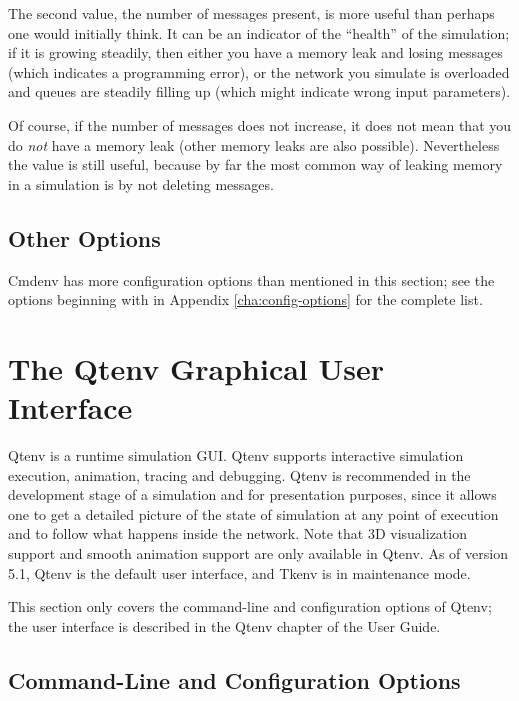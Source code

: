 The second value, the number of messages present, is more useful than
perhaps one would initially think. It can be an indicator of the ``health'' of the simulation;
if it is growing steadily, then either you have a memory leak and losing
messages (which indicates a programming error), or the network you simulate is
overloaded and queues are steadily filling up (which might indicate wrong input
parameters).

Of course, if the number of messages does not increase, it does not mean
that you do \textit{not} have a memory leak (other memory leaks are also
possible). Nevertheless the value is still useful, because by far the
most common way of leaking memory in a simulation is by not deleting messages.

\subsection{Other Options}
\label{sec:run-sim:cmdenv:other-options}

Cmdenv has more configuration options than mentioned in this section; see 
the options beginning with  in Appendix \ref{cha:config-options}
for the complete list.


\section{The Qtenv Graphical User Interface}
\label{sec:run-sim:qtenv}

Qtenv is a runtime simulation GUI. Qtenv supports
interactive simulation execution, animation, tracing and debugging.
Qtenv is recommended in the development stage of a simulation and for
presentation purposes, since it allows one to get a detailed picture of the
state  of simulation at any point of execution and to follow what happens
inside the network. Note that 3D visualization support and smooth animation
support are only available in Qtenv. As of version {\opp} 5.1, Qtenv is the
default user interface, and Tkenv is in maintenance mode.  

\begin{note}
This section only covers the command-line and configuration options
of Qtenv; the user interface is described in the Qtenv chapter of the
{\opp} User Guide.
\end{note}

\subsection{Command-Line and Configuration Options}
\label{sec:run-sim:qtenv-options}


